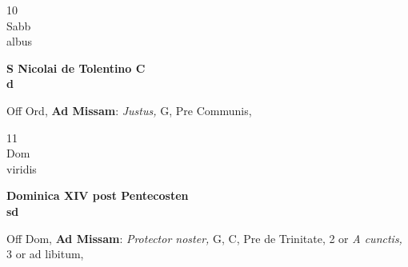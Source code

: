\documentclass[10pt, openany]{book}
\begin{document}
        \begin{center}
            \begin{minipage}{3.5in}
                \vspace{2em}
                \begin{minipage}{0.5in}
                    {\Huge 10} \\
                    {\normalsize Sabb} \\
                    {\normalsize albus}
                \end{minipage}
                \begin{minipage}{3.0in}
                    \textbf{ \large S Nicolai de Tolentino C \\
                    \textnormal{\normalsize d}} \\ 
                \end{minipage}
                \begin{justify}Off Ord, \textbf{Ad Missam}: \textit{Justus,} G, Pre Communis,   
                \end{justify}
            \end{minipage}
        \end{center}
    
        \begin{center}
            \begin{minipage}{3.5in}
                \vspace{2em}
                \begin{minipage}{0.5in}
                    {\Huge 11} \\
                    {\normalsize Dom} \\
                    {\normalsize viridis}
                \end{minipage}
                \begin{minipage}{3.0in}
                    \textbf{ \large Dominica XIV post Pentecosten \\
                    \textnormal{\normalsize sd}} \\ 
                \end{minipage}
                \begin{justify}Off Dom, \textbf{Ad Missam}: \textit{Protector noster,} G, C, Pre de Trinitate, 2 or \textit{A cunctis,} 3 or ad libitum,   
                \end{justify}
            \end{minipage}
        \end{center}
    
\end{document}
